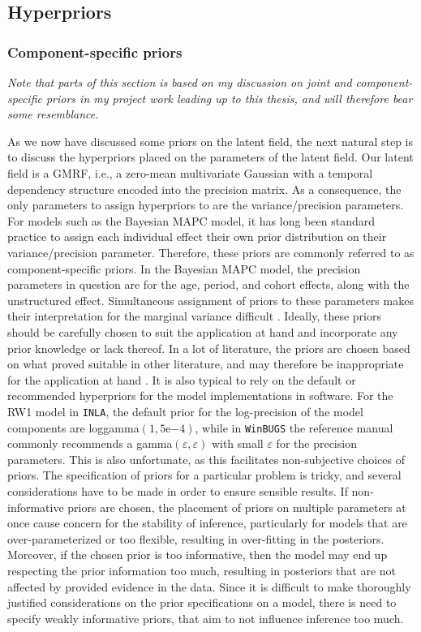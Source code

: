 \subsection{Hyperpriors}
\subsubsection{Component-specific priors}
\label{section:component_specific_priors}
\textit{Note that parts of this section is based on my discussion on joint and component-specific priors in my project work \citep{Prosjektoppgave} leading up to this thesis, and will therefore bear some resemblance.}

As we now have discussed some priors on the latent field, the next natural step is to discuss the hyperpriors placed on the parameters of the latent field. Our latent field is a GMRF, i.e., a zero-mean multivariate Gaussian with a temporal dependency structure encoded into the precision matrix. As a consequence, the only parameters to assign hyperpriors to are the variance/precision parameters. For models such as the Bayesian MAPC model, it has long been standard practice to assign each individual effect their own prior distribution on their variance/precision parameter. Therefore, these priors are commonly referred to as component-specific priors. In the Bayesian MAPC model, the precision parameters in question are for the age, period, and cohort effects, along with the unstructured effect. Simultaneous assignment of priors to these parameters makes their interpretation for the marginal variance difficult \citep{wakefield2006}. Ideally, these priors should be carefully chosen to suit the application at hand and incorporate any prior knowledge or lack thereof. In a lot of literature, the priors are chosen based on what proved suitable in other literature, and may therefore be inappropriate for the application at hand \citep{PC-priors}. It is also typical to rely on the default or recommended hyperpriors for the model implementations in software. For the RW1 model in \texttt{INLA}, the default prior for the log-precision of the model components are loggamma$(1, 5\mathrm{e}{-4})$, while in \texttt{WinBUGS} the reference manual commonly recommends a gamma$(\varepsilon, \varepsilon)$ with small $\varepsilon$ for the precision parameters. This is also unfortunate, as this facilitates non-subjective choices of priors. The specification of priors for a particular problem is tricky, and several considerations have to be made in order to ensure sensible results. If non-informative priors are chosen, the placement of priors on multiple parameters at once cause concern for the stability of inference, particularly for models that are over-parameterized or too flexible, resulting in over-fitting in the posteriors. Moreover, if the chosen prior is too informative, then the model may end up respecting the prior information too much, resulting in posteriors that are not affected by provided evidence in the data. Since it is difficult to make thoroughly justified considerations on the prior specifications on a model, there is need to specify weakly informative priors, that aim to not influence inference too much.

